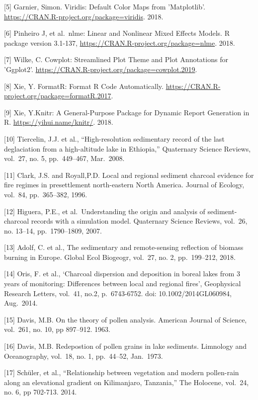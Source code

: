 \documentclass[
]{article}
\begin{document}
{[}5{]} Garnier, Simon. Viridis: Default Color Maps from 'Matplotlib'.
\url{https://CRAN.R-project.org/package=viridis}. 2018.

{[}6{]} Pinheiro J, et al.~nlme: Linear and Nonlinear Mixed Effects
Models. R package version 3.1-137,
\url{https://CRAN.R-project.org/package=nlme}. 2018.

{[}7{]} Wilke, C. Cowplot: Streamlined Plot Theme and Plot Annotations
for 'Ggplot2'. \url{https://CRAN.R-project.org/package=cowplot.2019}.

{[}8{]} Xie, Y. FormatR: Format R Code Automatically.
\url{https://CRAN.R-project.org/package=formatR.2017}.

{[}9{]} Xie, Y.Knitr: A General-Purpose Package for Dynamic Report
Generation in R. \url{https://yihui.name/knitr/}. 2018.

{[}10{]} Tiercelin, J.J. et al., ``High-resolution sedimentary record of
the last deglaciation from a high-altitude lake in Ethiopia,''
Quaternary Science Reviews, vol.~27, no. 5, pp.~449--467, Mar.~2008.

{[}11{]} Clark, J.S. and Royall,P.D. Local and regional sediment
charcoal evidence for fire regimes in presettlement north-eastern North
America. Journal of Ecology, vol.~84, pp.~365--382, 1996.

{[}12{]} Higuera, P.E., et al.~Understanding the origin and analysis of
sediment-charcoal records with a simulation model. Quaternary Science
Reviews, vol.~26, no. 13--14, pp.~1790--1809, 2007.

{[}13{]} Adolf, C. et al., The sedimentary and remote-sensing reflection
of biomass burning in Europe. Global Ecol Biogeogr, vol.~27, no. 2,
pp.~199--212, 2018.

{[}14{]} Oris, F. et al., `Charcoal dispersion and deposition in boreal
lakes from 3 years of monitoring: Differences between local and regional
fires', Geophysical Research Letters, vol.~41, no.2, p.~6743-6752. doi:
10.1002/2014GL060984, Aug.~2014.

{[}15{]} Davis, M.B. On the theory of pollen analysis. American Journal
of Science, vol.~261, no. 10, pp 897--912. 1963.

{[}16{]} Davis, M.B. Redepostion of pollen grains in lake sediments.
Limnology and Oceanography, vol.~18, no. 1, pp.~44--52, Jan.~1973.

{[}17{]} Schüler, et al., ``Relationship between vegetation and modern
pollen-rain along an elevational gradient on Kilimanjaro, Tanzania,''
The Holocene, vol.~24, no. 6, pp 702-713. 2014.
\end{document}
